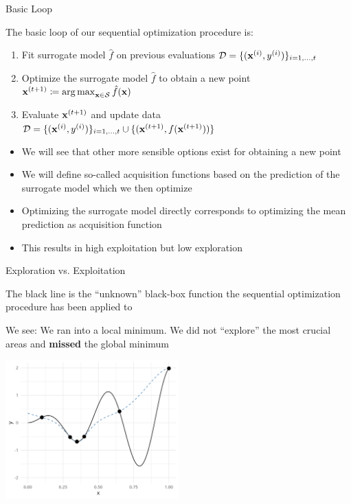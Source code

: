 \documentclass[11pt,compress,t,notes=noshow, xcolor=table]{beamer}
\begin{document}
\begin{vbframe}{Basic Loop}

The basic loop of our sequential optimization procedure is:
  \begin{enumerate}
    \item Fit surrogate model $\hat{f}$ on previous evaluations $\mathcal{D} = \{(\mathbf{x}^{(i)}, y^{(i)})\}_{i = 1, \ldots, t}$
    \item Optimize the surrogate model $\hat{f}$ to obtain a new point $\mathbf{x}^{(t + 1)} \coloneqq \operatorname{arg\,max}_{\mathbf{x} \in \mathcal{S}} \hat{f}(\mathbf{x})$
    \item Evaluate $\mathbf{x}^{(t + 1)}$ and update data $\mathcal{D} = \{(\mathbf{x}^{(i)}, y^{(i)})\}_{i = 1, \ldots, t} \cup \{(\mathbf{x}^{(t + 1)}, f(\mathbf{x}^{(t + 1)}))\}$
  \end{enumerate}

\framebreak

\begin{itemize}
  \item We will see that other more sensible options exist for obtaining a new point
  \item We will define so-called acquisition functions based on the prediction of the surrogate model which we then optimize
  \item Optimizing the surrogate model directly corresponds to optimizing the mean prediction as acquisition function
  \item This results in high exploitation but low exploration
\end{itemize}

\end{vbframe}

\begin{vbframe}{Exploration vs. Exploitation}

The black line is the \enquote{unknown} black-box function the sequential optimization procedure has been applied to

\vspace*{0.2cm} 
We see: We ran into a local minimum. We did not \enquote{explore} the most crucial areas and \textbf{missed} the global minimum

\vspace{+.45cm}

\begin{center}
  \includegraphics[width = 0.5\textwidth]{figure_man/loop_10.png}
\end{center}


\end{vbframe} 

\endlecture
\end{document}
